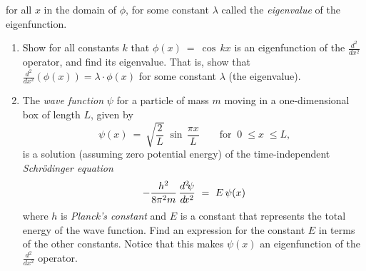 {\begin{enumerate}[item-label={\bfseries \arabic*.}]
\begin{center}
 \end{center}
  for all $x$ in the domain of $\phi$, for some constant $\lambda$ called the
  \emph{eigenvalue} of the eigenfunction.
  \begin{enumerate}[item-label={\bfseries (a)}]
   \item Show for all constants $k$ that $\phi(x) ~=~ \cos\,kx$ is an
    eigenfunction of the $\frac{d^2}{d\!x^2}$ operator, and find its eigenvalue.
    That is, show that $\frac{d^2}{d\!x^2}(\phi(x)) = \lambda \cdot \phi(x)$ for
    some constant $\lambda$ (the eigenvalue).
   \item The \emph{wave function} $\psi$ for a particle of mass $m$ moving in a
    one-dimensional box of length $L$, given by
    \begin{displaymath}
     \psi(x) ~=~ \sqrt{\frac{2}{L}}\;\sin\,\frac{\pi x}{L} \qquad\text{for
     $~0 \;\le x \;\le L$,}
	\end{displaymath}
    is a solution (assuming zero potential energy) of the time-independent
    \emph{Schr\"{o}dinger equation}
    \begin{displaymath}
     -\frac{h^2}{8\pi^2 m}\,\frac{d^2 \negmedspace\psi}{d\!x^2} ~=~ 
	 E\,\psi(x)
	\end{displaymath}
    where $h$ is \emph{Planck's constant}
    and $E$ is a constant that represents the total energy of the wave function.
    Find an expression for the constant $E$ in terms of the other constants.
    Notice that this makes $\psi(x)$ an
    eigenfunction of the $\frac{d^2}{d\!x^2}$ operator.
  \end{enumerate}
\end{enumerate}}
